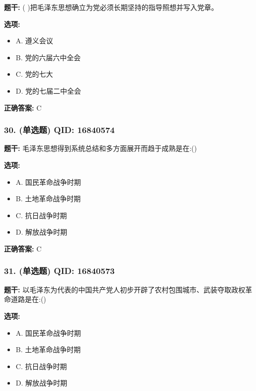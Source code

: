 \documentclass[12pt,UTF8]{ctexart}
\begin{document}
\textbf{题干:}
( )把毛泽东思想确立为党必须长期坚持的指导照想并写入党章。

\textbf{选项:}
\begin{itemize}[leftmargin=*]

  \item A. 遵义会议

  \item B. 党的六届六中全会

  \item C. 党的七大

  \item D. 党的七届二中全会

\end{itemize}

\textbf{正确答案:}
C

\vspace{0.3em}\hrulefill\vspace{0.7em}

\subsubsection*{30. (单选题) \small QID: 16840574}

\textbf{题干:}
毛泽东思想得到系统总结和多方面展开而趋于成熟是在:()

\textbf{选项:}
\begin{itemize}[leftmargin=*]

  \item A. 国民革命战争时期

  \item B. 土地革命战争时期

  \item C. 抗日战争时期

  \item D. 解放战争时期

\end{itemize}

\textbf{正确答案:}
C

\vspace{0.3em}\hrulefill\vspace{0.7em}

\subsubsection*{31. (单选题) \small QID: 16840573}

\textbf{题干:}
以毛泽东为代表的中国共产党人初步开辟了农村包围城市、武装夺取政权革命道路是在:()

\textbf{选项:}
\begin{itemize}[leftmargin=*]

  \item A. 国民革命战争时期

  \item B. 土地革命战争时期

  \item C. 抗日战争时期

  \item D. 解放战争时期

\end{itemize}
\end{document}

